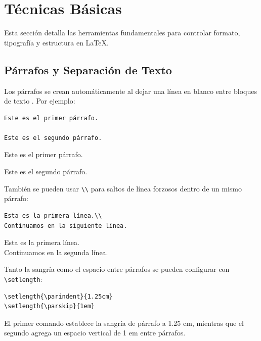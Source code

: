 \section{Técnicas Básicas}

Esta sección detalla las herramientas fundamentales para controlar formato, tipografía y estructura en \LaTeX.

\subsection{Párrafos y Separación de Texto}

Los párrafos se crean automáticamente al dejar una línea en blanco entre bloques de texto \cite{latex_project}. Por ejemplo:

\begin{verbatim}
Este es el primer párrafo.

Este es el segundo párrafo.
\end{verbatim}

\begin{tcolorbox}[title=Salida,colback=white!10,colframe=black,fonttitle=\bfseries]
Este es el primer párrafo.

Este es el segundo párrafo.
\end{tcolorbox}

También se pueden usar \texttt{\textbackslash\textbackslash} para saltos de línea forzosos dentro de un mismo párrafo:

\begin{verbatim}
Esta es la primera línea.\\
Continuamos en la siguiente línea.
\end{verbatim}

\begin{tcolorbox}[title=Salida,colback=white!10,colframe=black,fonttitle=\bfseries]
Esta es la primera línea.\\
Continuamos en la segunda línea.
\end{tcolorbox}

Tanto la sangría como el espacio entre párrafos se pueden configurar con \texttt{\textbackslash setlength}:

\begin{verbatim}
\setlength{\parindent}{1.25cm} 
\setlength{\parskip}{1em}
\end{verbatim}

El primer comando establece la sangría de párrafo a 1.25 cm, mientras que el segundo agrega un espacio vertical de 1 em entre párrafos.

